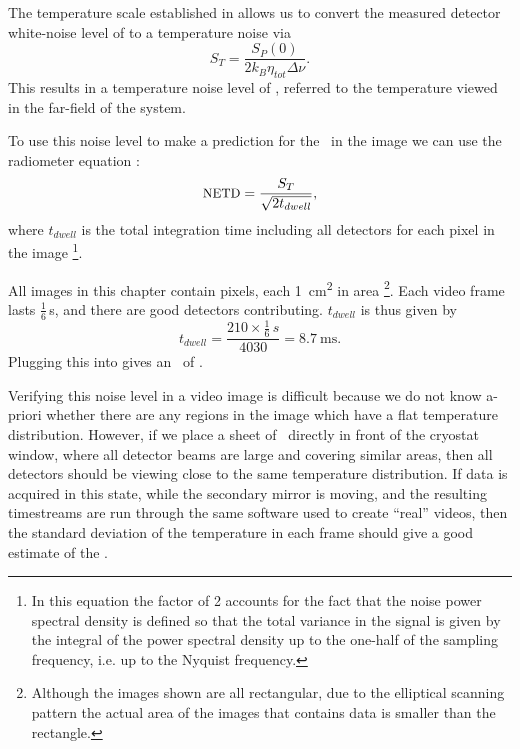 The temperature scale established in  allows us to convert the measured detector white-noise level of  to a temperature noise via
\begin{equation}
  S_T = \frac{S_P(0)}{2 k_B \eta_{tot} \Delta \nu}.
\end{equation}
This results in a temperature noise level of , referred to the temperature viewed in the far-field of the system.

To use this noise level to make a prediction for the \NETD\ in the image we can use the radiometer equation \cite{kraus_radio_1986}:
\begin{equation} \label{eqn:ch7-radiometer}
  \text{{\small NETD}} = \frac{S_T}{\sqrt{2 t_{dwell}}},
\end{equation}
where $t_{dwell}$ is the total integration time including all detectors for each pixel in the image%
\footnote{%
In this equation the factor of 2 accounts for the fact that the noise power spectral density is defined so that the total variance in the signal is given by the integral of the power spectral density up to the one-half of the sampling frequency, i.e. up to the Nyquist frequency.
}.

All images in this chapter contain  pixels, each \SI{1}{\cm^2} in area%
\footnote{
  Although the images shown are all rectangular, due to the elliptical scanning pattern the actual area of the images that contains data is smaller than the rectangle.
}.
Each video frame lasts $\frac{1}{6}$\,\si{\s}, and there are  good detectors contributing.
$t_{dwell}$ is thus given by
\begin{equation} \label{eqn:ch7-t-dwell}
  t_{dwell} = \frac{210 \times \frac{1}{6}\,\si{s}}{4030} = \SI{8.7}{\ms}.
\end{equation}
Plugging this into  gives an \NETD\ of .

Verifying this noise level in a video image is difficult because we do not know a-priori whether there are any regions in the image which have a flat temperature distribution.
However, if we place a sheet of \ecco\ directly in front of the cryostat window, where all detector beams are large and covering similar areas, then all detectors should be viewing close to the same temperature distribution.
If data is acquired in this state, while the secondary mirror is moving, and the resulting timestreams are run through the same software used to create ``real'' videos, then the standard deviation of the temperature in each frame should give a good estimate of the \NETD.

